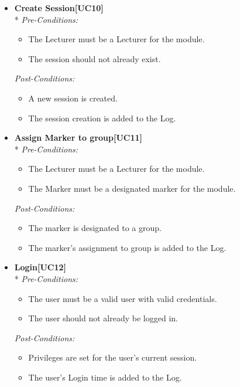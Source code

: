 \documentclass[a4paper]{article}
\begin{document}
\begin{itemize}
				\item	\textbf{Create Session[UC10]}\\*
						\textit{Pre-Conditions:}
								\begin{itemize}
									\item The Lecturer must be a Lecturer for the module.
									\item The session should not already exist.
								\end{itemize}
								
						\textit{Post-Conditions:}
								\begin{itemize}
									\item A new session is created.
									\item The session creation is added to the Log.
								\end{itemize}
														
				\item	\textbf{Assign Marker to group[UC11]}\\*
						\textit{Pre-Conditions:}
								\begin{itemize}
									\item The Lecturer must be a Lecturer for the module.
									\item The Marker must be a designated marker for the module.
								\end{itemize}
								
						\textit{Post-Conditions:}
								\begin{itemize}
									\item The marker is designated to a group.
									\item The marker's assignment to group is added to the Log.
								\end{itemize}
														
				\item	\textbf{Login[UC12]}\\*
						\textit{Pre-Conditions:}
								\begin{itemize}
									\item The user must be a valid user with valid credentials.
									\item The user should not already be logged in.
								\end{itemize}
								
						\textit{Post-Conditions:}
								\begin{itemize}
									\item Privileges are set for the user's current session.
									\item The user's Login time is added to the Log.
								\end{itemize}
														

\end{itemize}
\end{document}
